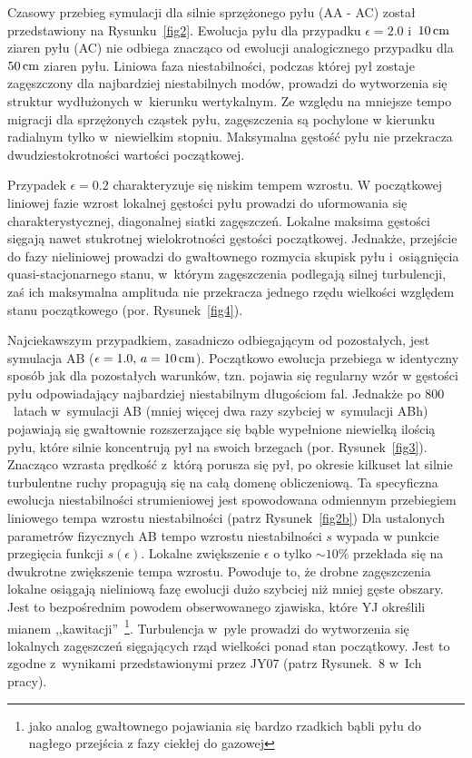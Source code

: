 Czasowy przebieg symulacji dla silnie sprzężonego pyłu (AA - AC) został
przedstawiony na Rysunku~\ref{fig2}. Ewolucja pyłu dla przypadku $\epsilon =
2.0$ i~$10\hbox{$\thinspace\textrm{cm}$}$ ziaren pyłu (AC) nie odbiega znacząco od ewolucji analogicznego
przypadku dla $50\hbox{$\thinspace\textrm{cm}$}$ ziaren pyłu. Liniowa faza niestabilności, podczas której
pył zostaje zagęszczony dla najbardziej niestabilnych modów, prowadzi do
wytworzenia się struktur wydłużonych w~kierunku wertykalnym. Ze względu na
mniejsze tempo migracji dla sprzężonych cząstek pyłu, zagęszczenia są pochylone
w kierunku radialnym tylko w~niewielkim stopniu. Maksymalna gęstość pyłu nie
przekracza dwudziestokrotności wartości początkowej.
\par Przypadek $\epsilon = 0.2$ charakteryzuje się niskim tempem wzrostu. W
początkowej liniowej fazie wzrost lokalnej gęstości pyłu prowadzi do uformowania
się charakterystycznej, diagonalnej siatki zagęszczeń. Lokalne maksima gęstości
sięgają nawet stukrotnej wielokrotności gęstości początkowej. Jednakże, przejście
do fazy nieliniowej prowadzi do gwałtownego rozmycia skupisk pyłu i~osiągnięcia
quasi-stacjonarnego stanu, w~którym zagęszczenia podlegają silnej turbulencji,
zaś ich maksymalna amplituda nie przekracza jednego rzędu wielkości względem
stanu początkowego (por. Rysunek~\ref{fig4}).

\par Najciekawszym przypadkiem, zasadniczo odbiegającym od pozostałych, jest
symulacja AB ($\epsilon=1.0,\, a=10\hbox{$\thinspace\textrm{cm}$}$). Początkowo ewolucja przebiega w
identyczny sposób jak dla pozostałych warunków, tzn. pojawia się regularny wzór
w gęstości pyłu odpowiadający najbardziej niestabilnym długościom fal. Jednakże 
po $800$~latach w~symulacji AB (mniej więcej dwa razy szybciej w~symulacji ABh)
pojawiają się gwałtownie rozszerzające się bąble wypełnione niewielką ilością
pyłu, które silnie koncentrują pył na swoich brzegach (por. Rysunek~\ref{fig3}). 
Znacząco wzrasta prędkość z~którą porusza się pył, po okresie kilkuset lat
silnie turbulentne ruchy propagują się na całą domenę obliczeniową. Ta
specyficzna ewolucja niestabilności strumieniowej jest spowodowana odmiennym
przebiegiem liniowego tempa wzrostu niestabilności (patrz Rysunek~\ref{fig2b})
Dla ustalonych parametrów fizycznych AB tempo wzrostu niestabilności $s$ wypada
w punkcie przegięcia funkcji $s(\epsilon)$. Lokalne zwiększenie $\epsilon$ o
tylko $\sim10\%$ przekłada się na dwukrotne zwiększenie tempa wzrostu. Powoduje
to, że drobne zagęszczenia lokalne osiągają nieliniową fazę ewolucji dużo
szybciej niż mniej gęste obszary.  Jest to bezpośrednim powodem obserwowanego
zjawiska, które YJ określili mianem ,,kawitacji''~\footnote{jako analog
gwałtownego pojawiania się bardzo rzadkich bąbli pyłu do nagłego przejścia z
fazy ciekłej do gazowej}.  Turbulencja w~pyle prowadzi do wytworzenia się
lokalnych zagęszczeń sięgających rząd wielkości ponad stan początkowy. Jest to
zgodne z~wynikami przedstawionymi przez JY07 (patrz Rysunek.~8 w~Ich pracy).

